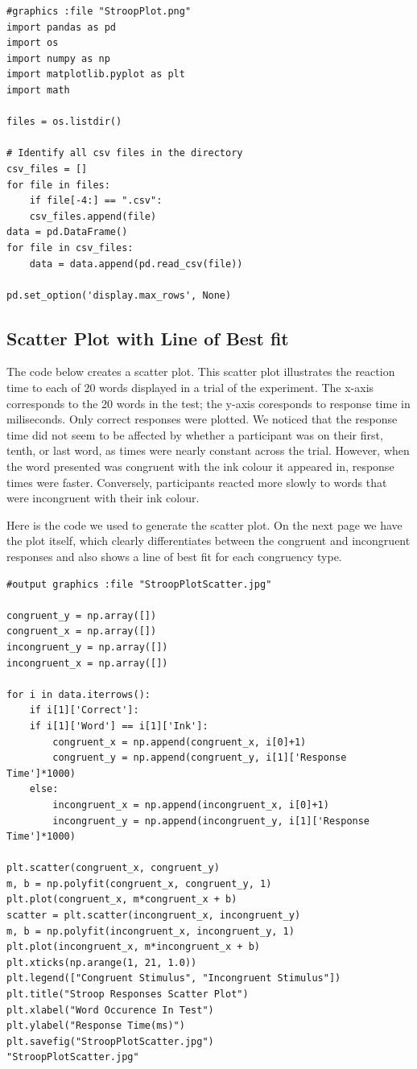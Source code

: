 \documentclass{article}
\begin{document}
\begin{verbatim}
#graphics :file "StroopPlot.png"
import pandas as pd
import os
import numpy as np
import matplotlib.pyplot as plt
import math

files = os.listdir()

# Identify all csv files in the directory
csv_files = []
for file in files:
    if file[-4:] == ".csv":
	csv_files.append(file)
data = pd.DataFrame()
for file in csv_files:
    data = data.append(pd.read_csv(file))

pd.set_option('display.max_rows', None)
\end{verbatim}


\subsection{Scatter Plot with Line of Best fit}
\label{sec:orgf46a098}

The code below creates a scatter plot. This scatter plot illustrates the reaction time to each of 20 words displayed in a trial of the experiment. The x-axis corresponds to the 20 words in the test; the y-axis coresponds to response time in miliseconds. Only correct responses were plotted. We noticed that the response time did not seem to be affected by whether a participant was on their first, tenth, or last word, as times were nearly constant across the trial. However, when the word presented was congruent with the ink colour it appeared in, response times were faster. Conversely, participants reacted more slowly to words that were incongruent with their ink colour.

Here is the code we used to generate the scatter plot. On the next page we have the plot itself, which clearly differentiates between the congruent and incongruent responses and also shows a line of best fit for each congruency type.

\begin{verbatim}
#output graphics :file "StroopPlotScatter.jpg"

congruent_y = np.array([])
congruent_x = np.array([])
incongruent_y = np.array([])
incongruent_x = np.array([])

for i in data.iterrows():
    if i[1]['Correct']:
	if i[1]['Word'] == i[1]['Ink']:
	    congruent_x = np.append(congruent_x, i[0]+1)
	    congruent_y = np.append(congruent_y, i[1]['Response Time']*1000)
	else:
	    incongruent_x = np.append(incongruent_x, i[0]+1)
	    incongruent_y = np.append(incongruent_y, i[1]['Response Time']*1000)

plt.scatter(congruent_x, congruent_y)
m, b = np.polyfit(congruent_x, congruent_y, 1)
plt.plot(congruent_x, m*congruent_x + b)
scatter = plt.scatter(incongruent_x, incongruent_y)
m, b = np.polyfit(incongruent_x, incongruent_y, 1)
plt.plot(incongruent_x, m*incongruent_x + b)
plt.xticks(np.arange(1, 21, 1.0))
plt.legend(["Congruent Stimulus", "Incongruent Stimulus"])
plt.title("Stroop Responses Scatter Plot")
plt.xlabel("Word Occurence In Test")
plt.ylabel("Response Time(ms)")
plt.savefig("StroopPlotScatter.jpg")
"StroopPlotScatter.jpg"

\end{verbatim}
\end{document}

